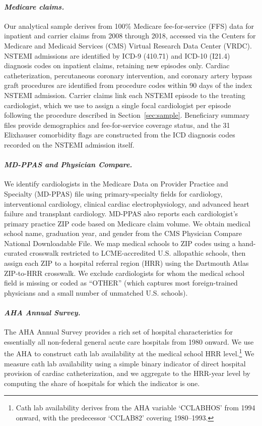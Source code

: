 \documentclass[12pt]{article}
\begin{document}
\paragraph{\textit{Medicare claims.}}
Our analytical sample derives from 100\% Medicare fee-for-service (FFS) data for inpatient and carrier claims from 2008 through 2018, accessed via the Centers for Medicare and Medicaid Services (CMS) Virtual Research Data Center (VRDC). NSTEMI admissions are identified by ICD-9 (410.71) and ICD-10 (I21.4) diagnosis codes on inpatient claims, retaining new episodes only. Cardiac catheterization, percutaneous coronary intervention, and coronary artery bypass graft procedures are identified from procedure codes within 90 days of the index NSTEMI admission. Carrier claims link each NSTEMI episode to the treating cardiologist, which we use to assign a single focal cardiologist per episode following the procedure described in Section~\ref{sec:sample}. Beneficiary summary files provide demographics and fee-for-service coverage status, and the 31 Elixhauser comorbidity flags are constructed from the ICD diagnosis codes recorded on the NSTEMI admission itself.

\paragraph{\textit{MD-PPAS and Physician Compare.}}
We identify cardiologists in the Medicare Data on Provider Practice and Specialty (MD-PPAS) file using primary-specialty fields for cardiology, interventional cardiology, clinical cardiac electrophysiology, and advanced heart failure and transplant cardiology. MD-PPAS also reports each cardiologist's primary practice ZIP code based on Medicare claim volume. We obtain medical school name, graduation year, and gender from the CMS Physician Compare National Downloadable File. We map medical schools to ZIP codes using a hand-curated crosswalk restricted to LCME-accredited U.S. allopathic schools, then assign each ZIP to a hospital referral region (HRR) using the Dartmouth Atlas ZIP-to-HRR crosswalk. We exclude cardiologists for whom the medical school field is missing or coded as ``OTHER'' (which captures most foreign-trained physicians and a small number of unmatched U.S. schools).

\paragraph{\textit{AHA Annual Survey.}}
The AHA Annual Survey provides a rich set of hospital characteristics for essentially all non-federal general acute care hospitals from 1980 onward. We use the AHA to construct cath lab availability at the medical school HRR level.\footnote{Cath lab availability derives from the AHA variable `CCLABHOS' from 1994 onward, with the predecessor `CCLAB82' covering 1980--1993.} We measure cath lab availability using a simple binary indicator of direct hospital provision of cardiac catheterization, and we aggregate to the HRR-year level by computing the share of hospitals for which the indicator is one.
\end{document}
